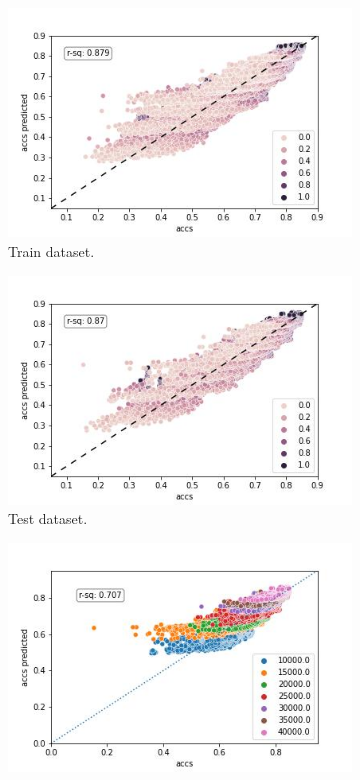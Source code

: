 \documentclass{article} %
\begin{document}
\begin{figure}
    \begin{subfigure}{.33\textwidth}
        \centering
        \includegraphics[width=.8\linewidth]{cifar10/powerlaw_all_epochs_accs_hat_classes_linear_epoch_linear.jpg}
        \caption{Train dataset.}
        \label{fig:powerlaw_acc_classes_linear_epoch_linear_train}
    \end{subfigure}%
    \begin{subfigure}{.33\textwidth}
        \centering
        \includegraphics[width=.8\linewidth]{cifar10/powerlaw_all_epochs_accs_hat_classes_linear_epoch_linear_val.jpg}
        \caption{Test dataset.}
        \label{fig:powerlaw_acc_classes_linear_epoch_linear_val}
    \end{subfigure}
    \begin{subfigure}{.33\textwidth}
        \centering
        \includegraphics[width=.8\linewidth]{cifar10/powerlaw_all_epochs_accs_hat_classes_linear_epoch_linear_val_forward_testing.jpg}

\end{subfigure}
\end{figure}
\end{document}
